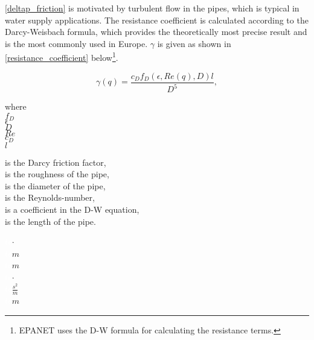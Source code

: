 \eqref{deltap_friction} is motivated by turbulent flow in the pipes, which is typical in water supply applications. The resistance coefficient is calculated according to the Darcy-Weisbach formula, which provides the theoretically most precise result and is the most commonly used in Europe\cite{prahata,agency2016epanet}. $\gamma$ is given as shown in \eqref{resistance_coefficient} below\footnote{EPANET uses the D-W formula for calculating the resistance terms.}.  

\begin{equation}
  \label{resistance_coefficient}
  \gamma(q) = \frac{c_D f_{D}(\epsilon,Re(q), D )l}{D^{5}},
\end{equation}

 \begin{minipage}[t]{0.20\textwidth}
where\\
\hspace*{8mm} $f_{D}$ \\
\hspace*{8mm} $\epsilon$ \\
\hspace*{8mm} $D$ \\
\hspace*{8mm} $Re$ \\
\hspace*{8mm} $c_D$ \\
\hspace*{8mm} $l$ 
\end{minipage}
\begin{minipage}[t]{0.68\textwidth}
\vspace*{2mm}
is the Darcy friction factor,  \\
is the roughness of the pipe,  \\
is the diameter of the pipe,  \\
is the Reynolds-number,  \\
is a coefficient in the D-W equation,  \\
is the length of the pipe.
\end{minipage}
\begin{minipage}[t]{0.10\textwidth}
\vspace*{2mm}
\textcolor{White}{te}$\unit{\cdot}$\\
\textcolor{White}{te}$\unit{m}$\\
\textcolor{White}{te}$\unit{m}$ \\
\textcolor{White}{te}$\unit{\cdot}$ \\
\textcolor{White}{te}$\unit{\frac{s^2}{m}}$ \\
\textcolor{White}{te}$\unit{m}$
\end{minipage}

